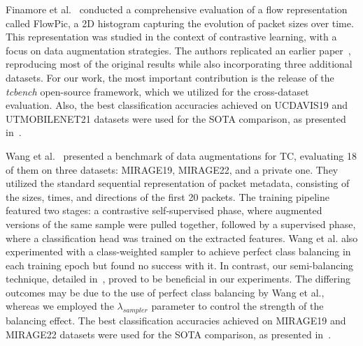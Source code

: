 Finamore et al.~\cite{finamore2023replication} conducted a comprehensive evaluation of a flow representation called FlowPic, a 2D histogram capturing the evolution of packet sizes over time. This representation was studied in the context of contrastive learning, with a focus on data augmentation strategies. The authors replicated an earlier paper~\cite{Horowicz2022flowpic}, reproducing most of the original results while also incorporating three additional datasets. For our work, the most important contribution is the release of the \textit{tcbench} open-source framework, which we utilized for the cross-dataset evaluation. Also, the best classification accuracies achieved on UCDAVIS19 and UTMOBILENET21 datasets were used for the SOTA comparison, as presented in~.

Wang et al.~\cite{wang2024augmentation} presented a benchmark of data augmentations for TC, evaluating 18 of them on three datasets: MIRAGE19, MIRAGE22, and a private one. They utilized the standard sequential representation of packet metadata, consisting of the sizes, times, and directions of the first 20 packets. The training pipeline featured two stages: a contrastive self-supervised phase, where augmented versions of the same sample were pulled together, followed by a supervised phase, where a classification head was trained on the extracted features. Wang et al. also experimented with a class-weighted sampler to achieve perfect class balancing in each training epoch but found no success with it. In contrast, our semi-balancing technique, detailed in~, proved to be beneficial in our experiments. The differing outcomes may be due to the use of perfect class balancing by Wang et al., whereas we employed the $\lambda_{sampler}$ parameter to control the strength of the balancing effect. The best classification accuracies achieved on MIRAGE19 and MIRAGE22 datasets were used for the SOTA comparison, as presented in~.